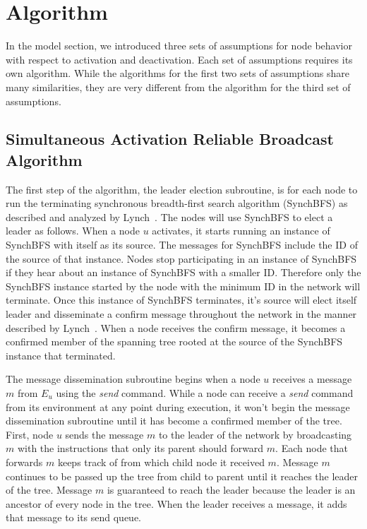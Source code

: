 \documentclass[english]{article}
\begin{document}
\section{Algorithm}

In the model section, we introduced three sets of assumptions for node behavior with respect to activation and deactivation. Each set of assumptions requires its own algorithm. While the algorithms for the first two sets of assumptions share many similarities, they are very different from the algorithm for the third set of assumptions.


  \subsection {Simultaneous Activation Reliable Broadcast Algorithm}

The first step of the algorithm, the leader election subroutine, is for each node to run the terminating synchronous breadth-first search algorithm (SynchBFS) as described and analyzed by Lynch~\cite{Lynch:1996}. The nodes will use SynchBFS to elect a leader as follows. When a node $u$ activates, it starts running an instance of SynchBFS with itself as its source. The messages for SynchBFS include the ID of the source of that instance. Nodes stop participating in an instance of SynchBFS if they hear about an instance of SynchBFS with a smaller ID. Therefore only the SynchBFS instance started by the node with the minimum ID in the network will terminate. Once this instance of SynchBFS terminates, it's source will elect itself leader and disseminate a confirm message throughout the network in the manner described by Lynch~\cite{Lynch:1996}. When a node receives the confirm message, it becomes a confirmed member of the spanning tree rooted at the source of the SynchBFS instance that terminated. 

The message dissemination subroutine begins when a node $u$ receives a message $m$ from $E_u$ using the \textit{send} command. While a node can receive a \textit{send} command from its environment at any point during execution, it won't begin the message dissemination subroutine until it has become a confirmed member of the tree. First, node $u$ sends the message $m$ to the leader of the network by broadcasting $m$ with the instructions that only its parent should forward $m$. Each node that forwards $m$ keeps track of from which child node it received $m$. Message $m$ continues to be passed up the tree from child to parent until it reaches the leader of the tree. Message $m$ is guaranteed to reach the leader because the leader is an ancestor of every node in the tree. When the leader receives a message, it adds that message to its send queue.
\end{document}
